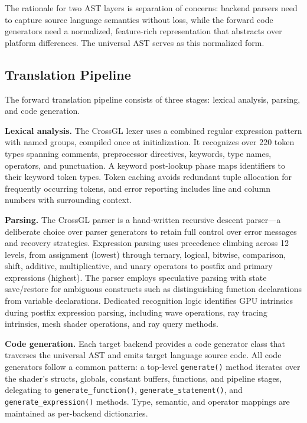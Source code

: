 \documentclass{svproc}
\begin{document}
The rationale for two AST layers is separation of concerns: backend parsers need to capture source language semantics without loss, while the forward code generators need a normalized, feature-rich representation that abstracts over platform differences. The universal AST serves as this normalized form.

\subsection{Translation Pipeline}

The forward translation pipeline consists of three stages: lexical analysis, parsing, and code generation.

\textbf{Lexical analysis.} The CrossGL lexer uses a combined regular expression pattern with named groups, compiled once at initialization. It recognizes over 220 token types spanning comments, preprocessor directives, keywords, type names, operators, and punctuation. A keyword post-lookup phase maps identifiers to their keyword token types. Token caching avoids redundant tuple allocation for frequently occurring tokens, and error reporting includes line and column numbers with surrounding context.

\textbf{Parsing.} The CrossGL parser is a hand-written recursive descent parser---a deliberate choice over parser generators to retain full control over error messages and recovery strategies. Expression parsing uses precedence climbing across 12 levels, from assignment (lowest) through ternary, logical, bitwise, comparison, shift, additive, multiplicative, and unary operators to postfix and primary expressions (highest). The parser employs speculative parsing with state save/restore for ambiguous constructs such as distinguishing function declarations from variable declarations. Dedicated recognition logic identifies GPU intrinsics during postfix expression parsing, including wave operations, ray tracing intrinsics, mesh shader operations, and ray query methods.

\textbf{Code generation.} Each target backend provides a code generator class that traverses the universal AST and emits target language source code. All code generators follow a common pattern: a top-level \texttt{generate()} method iterates over the shader's structs, globals, constant buffers, functions, and pipeline stages, delegating to \texttt{generate\_function()}, \texttt{generate\_statement()}, and \texttt{generate\_expression()} methods. Type, semantic, and operator mappings are maintained as per-backend dictionaries.
\end{document}
